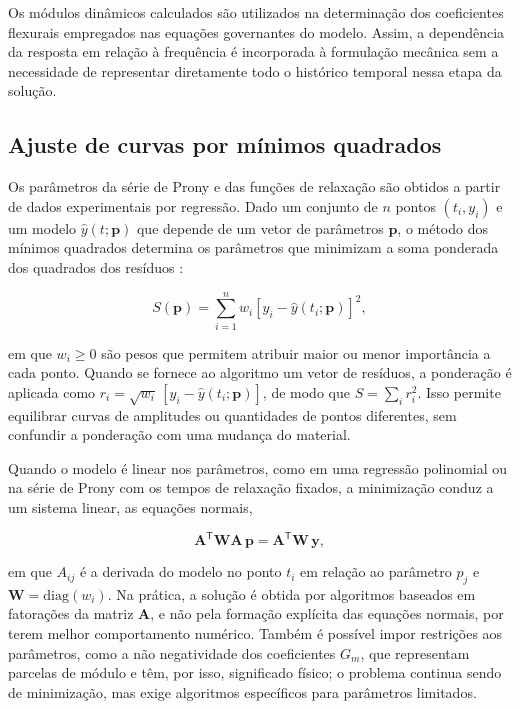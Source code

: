 \documentclass[arial,centeredequations,english,brazilian,oneside,section=TITLE]{ifes8}
\begin{document}
Os módulos dinâmicos calculados são utilizados na determinação dos
coeficientes flexurais empregados nas equações governantes do modelo.
Assim, a dependência da resposta em relação à frequência é incorporada
à formulação mecânica sem a necessidade de representar diretamente
todo o histórico temporal nessa etapa da solução.

\subsection{Ajuste de curvas por mínimos quadrados}
\label{subsec:minimos-quadrados}

Os parâmetros da série de Prony e das funções de relaxação são obtidos a partir de dados
experimentais por regressão. Dado um conjunto de $n$ pontos $(t_i, y_i)$ e um modelo
$\hat{y}(t;\mathbf{p})$ que depende de um vetor de parâmetros $\mathbf{p}$, o método dos
mínimos quadrados determina os parâmetros que minimizam a soma ponderada dos quadrados
dos resíduos \cite{Chapra2011}:

\begin{equation}
  S(\mathbf{p}) = \sum_{i=1}^{n} w_i\left[y_i - \hat{y}(t_i;\mathbf{p})\right]^2,
  \label{eq:minimos-quadrados}
\end{equation}

em que $w_i \geq 0$ são pesos que permitem atribuir maior ou menor importância a cada
ponto. Quando se fornece ao algoritmo um vetor de resíduos, a ponderação é aplicada
como $r_i=\sqrt{w_i}\,[y_i-\hat y(t_i;\mathbf p)]$, de modo que
$S=\sum_i r_i^2$. Isso permite equilibrar curvas de amplitudes ou quantidades
de pontos diferentes, sem confundir a ponderação com uma mudança do material.

Quando o modelo é linear nos parâmetros, como em uma regressão polinomial ou na série de
Prony com os tempos de relaxação fixados, a minimização conduz a um sistema linear, as
equações normais,

\begin{equation}
  \mathbf{A}^{\mathsf{T}}\mathbf{W}\mathbf{A}\,\mathbf{p}
  = \mathbf{A}^{\mathsf{T}}\mathbf{W}\,\mathbf{y},
  \label{eq:equacoes-normais}
\end{equation}

em que $A_{ij}$ é a derivada do modelo no ponto $t_i$ em relação ao parâmetro $p_j$ e
$\mathbf{W} = \mathrm{diag}(w_i)$. Na prática, a solução é obtida por algoritmos baseados
em fatorações da matriz $\mathbf{A}$, e não pela formação explícita das equações normais,
por terem melhor comportamento numérico. Também é possível impor restrições aos
parâmetros, como a não negatividade dos coeficientes $G_m$, que representam parcelas de
módulo e têm, por isso, significado físico; o problema continua sendo de minimização, mas
exige algoritmos específicos para parâmetros limitados.
\end{document}
